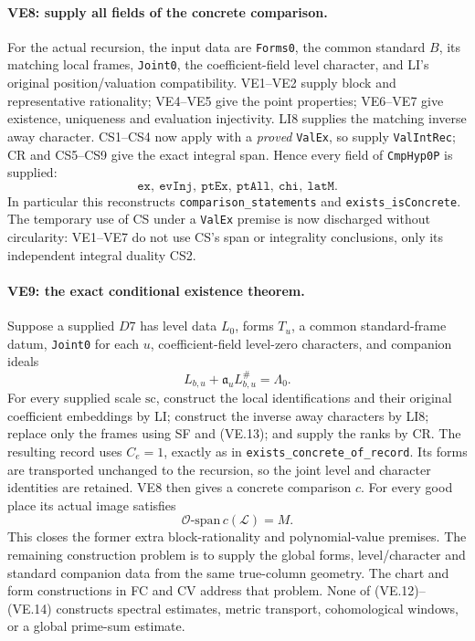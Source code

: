 \paragraph{VE8: supply all fields of the concrete comparison.}
For the actual recursion, the input data are
\texttt{Forms0}, the common standard $B$, its matching local frames,
\texttt{Joint0}, the coefficient-field level character, and LI's
original position/valuation compatibility. VE1--VE2 supply block
and representative rationality; VE4--VE5 give the point properties;
VE6--VE7 give existence, uniqueness and evaluation injectivity.
LI8 supplies the matching inverse away character. CS1--CS4 now apply
with a \emph{proved} \texttt{ValEx}, so supply \texttt{ValIntRec};
CR and CS5--CS9 give the exact integral span. Hence every field of
\texttt{CmpHyp0P} is supplied:
\[
 \texttt{ex},\ \texttt{evInj},\ \texttt{ptEx},\
 \texttt{ptAll},\ \texttt{chi},\ \texttt{latM}.
                                                        \tag{VE.12}
\]
In particular this reconstructs \texttt{comparison\_statements}
and \texttt{exists\_isConcrete}. The temporary use of CS under a
\texttt{ValEx} premise is now discharged without circularity: VE1--VE7
do not use CS's span or integrality conclusions, only its independent
integral duality CS2.

\paragraph{VE9: the exact conditional existence theorem.}
Suppose a supplied $D7$ has level data $L_0$, forms $T_u$, a common
standard-frame datum, \texttt{Joint0} for each $u$, coefficient-field
level-zero characters, and companion ideals
\[
 L_{b,u}+\mathfrak a_u L_{b,u}^{\#}=\Lambda_0.
                                                        \tag{VE.13}
\]
For every supplied scale $\mathrm{sc}$, construct the local
identifications and their original coefficient embeddings by LI;
construct the inverse away characters by LI8; replace only the frames
using SF and (VE.13); and supply the ranks by CR. The resulting
record uses $C_e=1$, exactly as in
\texttt{exists\_concrete\_of\_record}. Its forms are transported
unchanged to the recursion, so the joint level and character
identities are retained. VE8 then gives a concrete comparison $c$.
For every good place its actual image satisfies
\[
 \boxed{\quad\mathcal O\text{-span}\,c(\mathcal L)=M.\quad}
                                                        \tag{VE.14}
\]
This closes the former extra block-rationality and polynomial-value
premises. The remaining construction problem is to supply the
global forms, level/character and standard companion data from
the same true-column geometry. The chart and form constructions
in FC and CV address that problem. None of
(VE.12)--(VE.14) constructs spectral estimates, metric transport,
cohomological windows, or a global prime-sum estimate.

